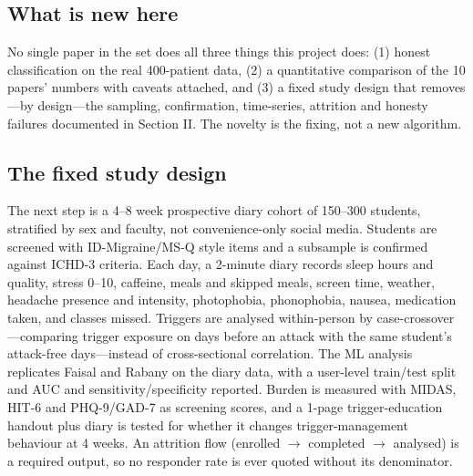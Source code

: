 \documentclass[conference]{IEEEtran}
\begin{document}
\subsection{What is new here}
No single paper in the set does all three things this project does: (1) honest classification on the real 400-patient data, (2) a quantitative comparison of the 10 papers' numbers with caveats attached, and (3) a fixed study design that removes---by design---the sampling, confirmation, time-series, attrition and honesty failures documented in Section II. The novelty is the fixing, not a new algorithm.

\subsection{The fixed study design}
The next step is a 4--8 week prospective diary cohort of 150--300 students, stratified by sex and faculty, not convenience-only social media. Students are screened with ID-Migraine/MS-Q style items and a subsample is confirmed against ICHD-3 criteria. Each day, a 2-minute diary records sleep hours and quality, stress 0--10, caffeine, meals and skipped meals, screen time, weather, headache presence and intensity, photophobia, phonophobia, nausea, medication taken, and classes missed. Triggers are analysed within-person by case-crossover---comparing trigger exposure on days before an attack with the same student's attack-free days---instead of cross-sectional correlation. The ML analysis replicates Faisal and Rabany on the diary data, with a user-level train/test split and AUC and sensitivity/specificity reported. Burden is measured with MIDAS, HIT-6 and PHQ-9/GAD-7 as screening scores, and a 1-page trigger-education handout plus diary is tested for whether it changes trigger-management behaviour at 4 weeks. An attrition flow (enrolled $\rightarrow$ completed $\rightarrow$ analysed) is a required output, so no responder rate is ever quoted without its denominator.
\end{document}
